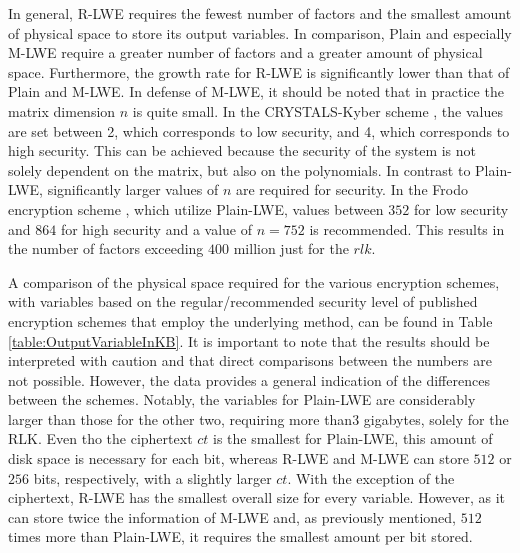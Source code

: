 In general, R-LWE requires the fewest number of factors and the smallest amount of physical space to store its output variables. In comparison, Plain and especially M-LWE require a greater number of factors and a greater amount of physical space. Furthermore, the growth rate for R-LWE is significantly lower than that of Plain and M-LWE. In defense of M-LWE, it should be noted that in practice the matrix dimension $n$ is quite small. In the CRYSTALS-Kyber scheme \cite{CyrstalsKyber}, the values are set between 2, which corresponds to low security, and 4, which corresponds to high security. This can be achieved because the security of the system is not solely dependent on the matrix, but also on the polynomials. In contrast to Plain-LWE, significantly larger values of $n$ are required for security. In the Frodo encryption scheme \cite{frodo}, which utilize Plain-LWE, values between $352$ for low security and $864$ for high security and a value of $n=752$ is recommended. This results in the number of factors exceeding $400$ million just for the $rlk$.

A comparison of the physical space required for the various encryption schemes, with variables based on the regular/recommended security level of published encryption schemes that employ the underlying method, can be found in Table \ref{table:OutputVariableInKB}. It is important to note that the results should be interpreted with caution and that direct comparisons between the numbers are not possible. However, the data provides a general indication of the differences between the schemes. Notably, the variables for Plain-LWE are considerably larger than those for the other two, requiring more than$3$ gigabytes, solely for the RLK. Even tho the ciphertext $ct$ is the smallest for Plain-LWE, this amount of disk space is necessary for each bit, whereas R-LWE and M-LWE can store $512$ or $256$ bits, respectively, with a slightly larger $ct$. With the exception of the ciphertext, R-LWE has the smallest overall size for every variable. However, as it can store twice the information of M-LWE and, as previously mentioned, $512$ times more than Plain-LWE, it requires the smallest amount per bit stored.

